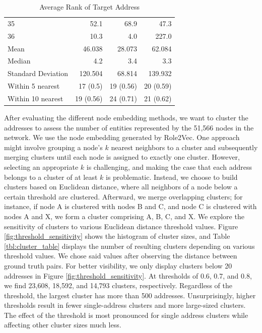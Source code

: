 \documentclass[12pt,a4paper,titlepage,oneside,english]{article}
\begin{document}
\begin{table}[h!]
\begin{tabular}{lrrr}
    35 & 52.1 & 68.9 & 47.3 \\
    36 & 10.3 & 4.0 & 227.0 \\
    \hline
    Mean & 46.038 & 28.073 & 62.084 \\
    Median & 4.2 & 3.4 & 3.3 \\
    Standard Deviation & 120.504 & 68.814 &  139.932\\
    Within 5 nearest & 17 (0.5) & 19 (0.56) & 20 (0.59) \\
    Within 10 nearest & 19 (0.56) & 24 (0.71) & 21 (0.62)\\
    \hline
  \end{tabular}
  \caption{Average Rank of Target Address}
  \label{tbl:ENS_Domain_Ranks}
\end{table}

After evaluating the different node embedding methods, we want to cluster the addresses to assess the number of entities represented by the 51,566 nodes in the network. We use the node embedding generated by Role2Vec. \newline
One approach might involve grouping a node's $k$ nearest neighbors to a cluster and subsequently merging clusters until each node is assigned to exactly one cluster. However, selecting an appropriate $k$ is challenging, and making the case that each address belongs to a cluster of at least $k$ is problematic. \newline
Instead, we choose to build clusters based on Euclidean distance, where all neighbors of a node below a certain threshold are clustered. Afterward, we merge overlapping clusters; for instance, if node A is clustered with nodes B and C, and node C is clustered with nodes A and X, we form a cluster comprising A, B, C, and X. \newline
We explore the sensitivity of clusters to various Euclidean distance threshold values. Figure \ref{fig:threshold_sensitivity} shows the histogram of cluster sizes, and Table \ref{tbl:cluster_table} displays the number of resulting clusters depending on various threshold values. We chose said values after observing the distance between ground truth pairs. For better visibility, we only display clusters below 20 addresses in Figure \ref{fig:threshold_sensitivity}. At thresholds of 0.6, 0.7, and 0.8, we find 23,608, 18,592, and 14,793 clusters, respectively. Regardless of the threshold, the largest cluster has more than 500 addresses. Unsurprisingly, higher thresholds result in fewer single-address clusters and more large-sized clusters. The effect of the threshold is most pronounced for single address clusters while affecting other cluster sizes much less. 
\end{document}
